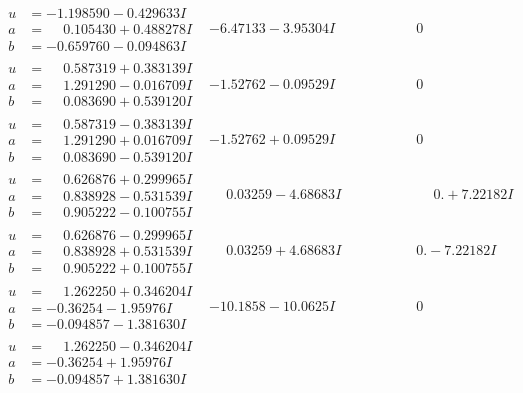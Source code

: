 \documentclass[1p]{elsarticle_modified}
\theoremstyle{definition}
\begin{document}
$$\begin{array}{c|c|c}
\begin{aligned}
u &= -1.198590 - 0.429633 I \\
a &= \phantom{-}0.105430 + 0.488278 I \\
b &= -0.659760 - 0.094863 I\end{aligned}
 & -6.47133 - 3.95304 I & \phantom{-0.000000 } 0 \\ \hline\begin{aligned}
u &= \phantom{-}0.587319 + 0.383139 I \\
a &= \phantom{-}1.291290 - 0.016709 I \\
b &= \phantom{-}0.083690 + 0.539120 I\end{aligned}
 & -1.52762 - 0.09529 I & \phantom{-0.000000 } 0 \\ \hline\begin{aligned}
u &= \phantom{-}0.587319 - 0.383139 I \\
a &= \phantom{-}1.291290 + 0.016709 I \\
b &= \phantom{-}0.083690 - 0.539120 I\end{aligned}
 & -1.52762 + 0.09529 I & \phantom{-0.000000 } 0 \\ \hline\begin{aligned}
u &= \phantom{-}0.626876 + 0.299965 I \\
a &= \phantom{-}0.838928 - 0.531539 I \\
b &= \phantom{-}0.905222 - 0.100755 I\end{aligned}
 & \phantom{-}0.03259 - 4.68683 I & \phantom{-0.000000 -}0. + 7.22182 I \\ \hline\begin{aligned}
u &= \phantom{-}0.626876 - 0.299965 I \\
a &= \phantom{-}0.838928 + 0.531539 I \\
b &= \phantom{-}0.905222 + 0.100755 I\end{aligned}
 & \phantom{-}0.03259 + 4.68683 I & \phantom{-0.000000 } 0. - 7.22182 I \\ \hline\begin{aligned}
u &= \phantom{-}1.262250 + 0.346204 I \\
a &= -0.36254 - 1.95976 I \\
b &= -0.094857 - 1.381630 I\end{aligned}
 & -10.1858 - 10.0625 I & \phantom{-0.000000 } 0 \\ \hline\begin{aligned}
u &= \phantom{-}1.262250 - 0.346204 I \\
a &= -0.36254 + 1.95976 I \\
b &= -0.094857 + 1.381630 I\end{aligned}

\end{array}$$
\end{document}
